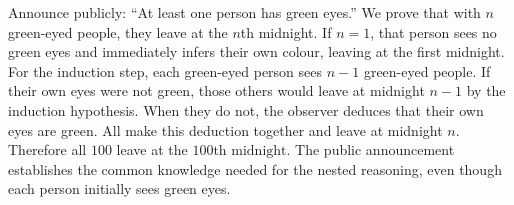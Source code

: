 Announce publicly: ``At least one person has green eyes.'' We prove that with $n$ green-eyed people, they leave at the $n$th midnight. If $n=1$, that person sees no green eyes and immediately infers their own colour, leaving at the first midnight. For the induction step, each green-eyed person sees $n-1$ green-eyed people. If their own eyes were not green, those others would leave at midnight $n-1$ by the induction hypothesis. When they do not, the observer deduces that their own eyes are green. All make this deduction together and leave at midnight $n$. Therefore all $100$ leave at the $\boxed{100\text{th midnight}}$. The public announcement establishes the common knowledge needed for the nested reasoning, even though each person initially sees green eyes.
